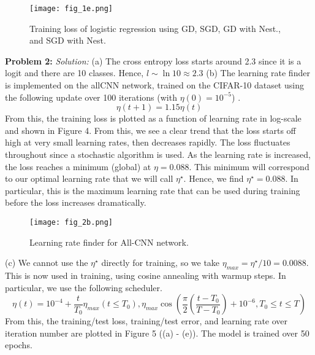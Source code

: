 \documentclass[12pt]{article}
\begin{document}
 
\begin{figure}[h!]
\texttt{[image: fig\_1e.png]}
\caption{Training loss of logistic regression using GD, SGD, GD with Nest., and SGD with Nest.} 
\centering
\end{figure}


\textbf{Problem 2:}  \newline   \newline 
\emph{Solution:} \newline 
(a) The cross entropy loss starts around 2.3 since it is a logit and there are 10 classes.  Hence, $ l  \sim \ln 10  \approx 2.3$   \newline \newline   
(b) The learning rate finder is implemented on the allCNN network, trained on the CIFAR-10 dataset using the following update over 100 iterations (with $\eta (0)  = 10^{-5}$) . 
$$ \eta (t+1) = 1.15 \eta (t)  $$
 From this, the training loss is plotted as a function of learning rate in log-scale and shown in Figure 4. From this, we see a clear trend that the loss starts off high at very small learning rates, then decreases rapidly. The loss fluctuates throughout since a stochastic algorithm is used.   As the learning rate is increased, the loss reaches a minimum (global)  at $\eta = 0.088$. This minimum will correspond to our optimal learning rate that we will call $\eta^{\star}$. Hence, we find $\eta^{\star} = 0.088$. In particular, this is the maximum learning rate that can be used during training before the loss increases dramatically. \newline  
 \begin{figure}[h!]
\texttt{[image: fig\_2b.png]}
\caption{Learning rate finder for All-CNN network.} 
\centering
\end{figure} 
(c) We cannot use the $\eta^{\star}$ directly for training, so we take $\eta_{max} = \eta^{\star}/10 =  0.0088$. This is now used in training, using cosine annealing with warmup steps. In particular, we use the following scheduler. 
$$ \eta (t) =  10^{-4} + \frac{t }{ T_{0} }  \eta_{max} (t \leq T_{0}),  \eta_{max} \cos (\frac{\pi }{ 2}  (\frac{t - T_{0}  }{ T - T_{0} }  ) + 10^{-6} , T_{0} \leq t \leq T  ) $$  
From this, the training/test loss, training/test error, and learning rate over iteration number are plotted in Figure 5 ((a) - (e)). The model is trained over 50 epochs.    
 
 
 
\end{document}
